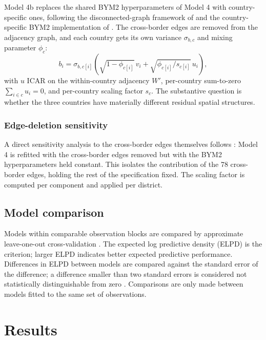 \documentclass{article}
\begin{document}
Model 4b replaces the shared BYM2 hyperparameters of Model 4 with
country-specific ones, following the disconnected-graph framework of
\citep{freni2018} and the country-specific BYM2 implementation of
\citep{donegan2021}. The cross-border edges are removed from the
adjacency graph, and each country gets its own variance \(\sigma_{b,c}\)
and mixing parameter \(\phi_c\): \begin{equation}
b_i = \sigma_{b, c[i]}\!\left(\sqrt{1 - \phi_{c[i]}}\,v_i
        + \sqrt{\phi_{c[i]} / s_{c[i]}}\,u_i\right),
\end{equation} with \(u\) ICAR on the within-country adjacency \(W'\),
per-country sum-to-zero \(\sum_{i \in c} u_i = 0\), and per-country
scaling factor \(s_c\). The substantive question is whether the three
countries have materially different residual spatial structures.

\subsubsection{Edge-deletion
sensitivity}\label{edge-deletion-sensitivity}

A direct sensitivity analysis to the cross-border edges themselves
follows \citep{earnest2007}: Model 4 is refitted with the cross-border
edges removed but with the BYM2 hyperparameters held constant. This
isolates the contribution of the 78 cross-border edges, holding the rest
of the specification fixed. The scaling factor is computed per component
\citep{freni2018} and applied per district.

\subsection{Model comparison}\label{model-comparison}

Models within comparable observation blocks are compared by approximate
leave-one-out cross-validation \citep{vehtari2017}. The expected log
predictive density (ELPD) is the criterion; larger ELPD indicates better
expected predictive performance. Differences in ELPD between models are
compared against the standard error of the difference; a difference
smaller than two standard errors is considered not statistically
distinguishable from zero \citep{vehtari2017}. Comparisons are only made
between models fitted to the same set of observations.

\section{Results}\label{results}
\end{document}
